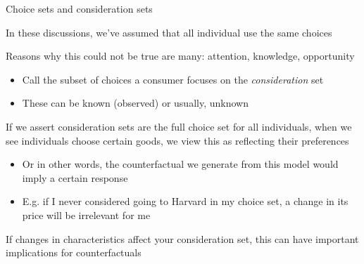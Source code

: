\documentclass[notes,11pt, aspectratio=169]{beamer}
\newenvironment{wideitemize}{\itemize\addtolength{\itemsep}{10pt}}{\enditemize}
\begin{document}
\begin{frame}{Choice sets and consideration sets}
  \begin{wideitemize}
  \item In these discussions, we've assumed that all individual use the same choices
  \item Reasons why this could not be true are many: attention,
    knowledge, opportunity
    \begin{itemize}
    \item Call the subset of choices a consumer focuses on the
      \emph{consideration} set
    \item These can be known (observed) or usually, unknown
    \end{itemize}
  \item If we assert consideration sets are the full choice set for
    all individuals, when we see individuals choose certain goods, we
    view this as reflecting their preferences
    \begin{itemize}
    \item Or in other words, the counterfactual we generate from this
      model would imply a certain response
    \item E.g. if I never considered going to Harvard in my choice
      set, a change in its price will be irrelevant for me
    \end{itemize}
  \item If changes in characteristics affect your consideration set,
    this can have important implications for counterfactuals
  \end{wideitemize}
\end{frame}
\end{document}
